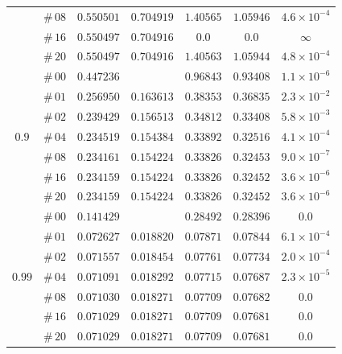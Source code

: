 \documentclass[12pt]{extarticle}
\theoremstyle{plain}
\theoremstyle{remark}
\begin{document}
\begin{table}[!ht]
\begin{center}
\begin{tabular}{ccccccc}
 & $\#\,08$ & $0.550501$ & $0.704919$ & $1.40565$ & $1.05946$ & $4.6\times10^{-4}$ \\
 & $\#\,16$ & $0.550497$ & $0.704916$ & $0.0$ & $0.0$ & $\infty$ \\
 & $\#\,20$ & $0.550497$ & $0.704916$ & $1.40563$ & $1.05944$ & $4.8\times10^{-4}$ \\
\midrule
\multirow{7}{*}{$0.9$} & $\#\,00$ & $0.447236$ &  & $0.96843$ & $0.93408$ & $1.1\times10^{-6}$ \\
 & $\#\,01$ & $0.256950$ & $0.163613$ & $0.38353$ & $0.36835$ & $2.3\times10^{-2}$ \\
 & $\#\,02$ & $0.239429$ & $0.156513$ & $0.34812$ & $0.33408$ & $5.8\times10^{-3}$ \\
 & $\#\,04$ & $0.234519$ & $0.154384$ & $0.33892$ & $0.32516$ & $4.1\times10^{-4}$ \\
 & $\#\,08$ & $0.234161$ & $0.154224$ & $0.33826$ & $0.32453$ & $9.0\times10^{-7}$ \\
 & $\#\,16$ & $0.234159$ & $0.154224$ & $0.33826$ & $0.32452$ & $3.6\times10^{-6}$ \\
 & $\#\,20$ & $0.234159$ & $0.154224$ & $0.33826$ & $0.32452$ & $3.6\times10^{-6}$ \\
\midrule
\multirow{7}{*}{$0.99$} & $\#\,00$ & $0.141429$ &  & $0.28492$ & $0.28396$ & $0.0$ \\
 & $\#\,01$ & $0.072627$ & $0.018820$ & $0.07871$ & $0.07844$ & $6.1\times10^{-4}$ \\
 & $\#\,02$ & $0.071557$ & $0.018454$ & $0.07761$ & $0.07734$ & $2.0\times10^{-4}$ \\
 & $\#\,04$ & $0.071091$ & $0.018292$ & $0.07715$ & $0.07687$ & $2.3\times10^{-5}$ \\
 & $\#\,08$ & $0.071030$ & $0.018271$ & $0.07709$ & $0.07682$ & $0.0$ \\
 & $\#\,16$ & $0.071029$ & $0.018271$ & $0.07709$ & $0.07681$ & $0.0$ \\
 & $\#\,20$ & $0.071029$ & $0.018271$ & $0.07709$ & $0.07681$ & $0.0$ \\
\bottomrule
\end{tabular}
\label{supp-table-1D-IterativeMethod-M=0.50}
\end{center}
\end{table}
\end{document}
